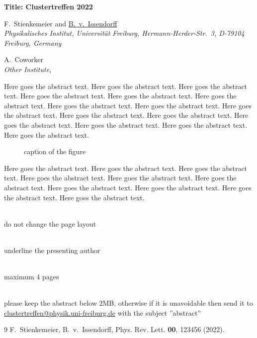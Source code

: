 \documentclass[12pt,a4paper]{article}
\begin{document}
\begin{center}{\large\bf  Title: Clustertreffen 2022}\bigskip

F.~Stienkemeier and \underline{B.~v.~Issendorff}\\

{\it Physikalisches Institut, Universit\"at Freiburg, Hermann-Herder-Str.\ 3, D-79104
Freiburg, Germany}\medskip

A.~Coworker\\ {\it Other Institute, }\end{center}\bigskip

\noindent Here goes the abstract text. Here goes the abstract text. Here goes the
abstract text. Here goes the abstract text. Here goes the abstract text. Here goes the
abstract text. Here goes the abstract text. Here goes the abstract text. Here goes the
abstract text. Here goes the abstract text. Here goes the abstract text. Here goes the
abstract text. Here goes the abstract text. Here goes the abstract text. Here goes the
abstract text.

\begin{figure}[h!]
    \caption{caption of the figure}
\end{figure}

Here goes the abstract text. Here goes the abstract text. Here goes the abstract text.
Here goes the abstract text. Here goes the abstract text. Here goes the abstract text.
Here goes the abstract text. Here goes the abstract text. Here goes the abstract text.
Here goes the abstract text.

~\\do not change the page layout

~\\ underline the presenting author

~\\ maximum 4 pages

~\\please keep the abstract below 2MB, otherwise if it is unavoidable then send it to\\ \underline{clustertreffen@physik.uni-freiburg.de} with the subject ''abstract''

\def\refname{}
\begin{thebibliography}{9} \small
{}  F.~Stienkemeier, B.~v.~Issendorff,
Phys. Rev. Lett. {\bf 00}, 123456 (2022).
\end{thebibliography}
\end{document}
